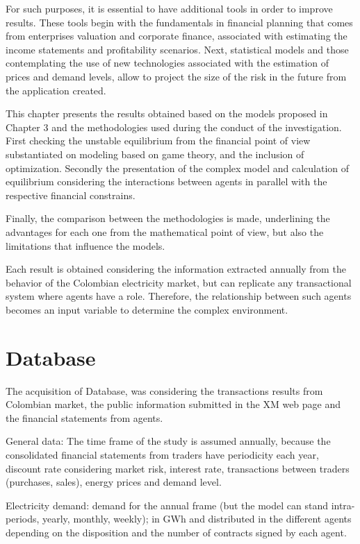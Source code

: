 \documentclass[12pt]{book}
\begin{document}
For such purposes, it is essential to have additional tools in order to improve results. These tools begin with the fundamentals in financial planning that comes from enterprises valuation and corporate finance, associated with estimating the income statements and profitability scenarios. Next, statistical models and those contemplating the use of new technologies associated with the estimation of prices and demand levels, allow to project the size of the risk in the future from the application created.

This chapter presents the results obtained based on the models proposed in Chapter 3 and the methodologies used during the conduct of the investigation. First checking the unstable equilibrium from the financial point of view substantiated on modeling based on game theory, and the inclusion of optimization. Secondly the presentation of the complex model and calculation of equilibrium considering the interactions between agents in parallel with the respective financial constrains. 

Finally, the comparison between the methodologies is made, underlining the advantages for each one from the mathematical point of view, but also the limitations that influence the models.

Each result is obtained considering the information extracted annually from the behavior of the Colombian electricity market, but can replicate any transactional system where agents have a role. Therefore, the relationship between such agents becomes an input variable to determine the complex environment.

\section{Database}

The acquisition of Database, was considering the transactions results from Colombian market, the public information submitted in the XM web page and the financial statements from agents.

General data: The time frame of the study is assumed annually, because the consolidated financial statements from traders have periodicity each year, discount rate considering market risk, interest rate, transactions between traders (purchases, sales), energy prices and demand level. 

Electricity demand: demand for the annual frame (but the model can stand intra-periods, yearly, monthly, weekly); in GWh and distributed in the different agents depending on the disposition and the number of contracts signed by each agent.
\end{document}
